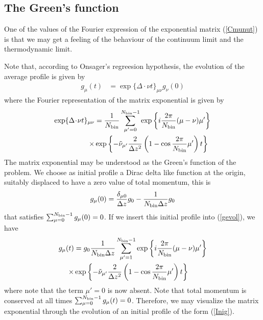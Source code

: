 \documentclass[a4paper,openright,12pt]{book}
\newcommand{\esc}{\!\cdot\!}
\begin{document}
{\subsection{The Green's function}
One of the values of the  Fourier expression of the exponential matrix
(\ref{Cmunut}) is  that we may get  a feeling of the  behaviour of the
continuum limit and the thermodynamic  limit. 

Note that, according to Onsager's regreesion hypothesis, the evolution
of the average profile is given by 
\begin{align}
  g_\mu(t)&=\exp\{\Delta\esc\nu t\}_{\mu\nu}  g_\nu(0)
\label{gevol}
\end{align}
where the Fourier representation of the matrix exponential is given by
\begin{align}
  \exp\{\Delta\esc\nu t\}_{\mu\nu} &=
\frac{1}{{N_{\rm bin}}}\sum_{\mu'=0}^{{N_{\rm bin}}-1}\exp\left\{i\frac{2\pi}{{N_{\rm bin}}}(\mu-\nu)\mu'\right\}
\nonumber\\
\times&\exp\left\{-\tilde{\nu}_{\mu'}\frac{2}{\Delta z^2}\left(1-\cos\frac{2\pi}{{N_{\rm bin}}}\mu'\right)t\right\}
\end{align}
The matrix  exponential may be  understood as the Green's  function of
the problem.  We choose as initial  profile a Dirac delta like function at
the origin, suitably displaced to have a zero value of total momentum,
this is
\begin{align}
  g_\mu(0)=\frac{\delta_{\mu 0}}{\Delta z}g_0-\frac{1}{{N_{\rm bin}}\Delta z}g_0
\label{Inig}
\end{align}
that  satisfies  $\sum_{\mu=0}^{{N_{\rm bin}}-1}g_\mu(0)=0$.  If  we  insert  this
initial profile into (\ref{gevol}), we have
\begin{align}
  g_\mu(t)&=
g_0\frac{1}{{N_{\rm bin}}\Delta z}\sum_{\mu'=1}^{{N_{\rm bin}}-1}\exp\left\{i\frac{2\pi}{{N_{\rm bin}}}(\mu-\nu)\mu'\right\}
\nonumber\\
\times&\exp\left\{-\tilde{\nu}_{\mu'}\frac{2}{\Delta z^2}\left(1-\cos\frac{2\pi}{{N_{\rm bin}}}\mu'\right)t\right\}
\label{gmut}
\end{align}
where note  that the  term $\mu'=0$  is now  absent.  Note  that total
momentum   is   conserved    at   all   times   $\sum_{\mu=0}^{{N_{\rm
      bin}}-1}g_\mu(t)=0$.   Therefore, we  may  visualize the  matrix
exponential through  the evolution of  an initial profile of  the form
(\ref{Inig}).

}
\end{document}
